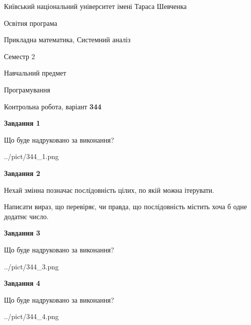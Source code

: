 \documentclass[12pt, ukrainian]{article}
\begin{document}
{{\begin {small}\par
{ \center  Київський національний університет імені Тараса Шевченка \par}
{\parbox {5 cm}{Освітня програма \hfill}{\parbox {8 cm}{Прикладна математика, Системний аналіз \hfill}}\parbox {5 cm}{\hfill Семестр 2}}\par
{\parbox {5 cm} {Навчальний предмет \hfill}\parbox {7 cm}{Програмування \hfill}\parbox {6cm}{\hfill}\par}\vspace{-7pt} \end{small}}{\center Контрольна робота, варіант  \No \textbf
{ 344 }\par}}
{
\begin {large}
{\begin {center}\textbf{Завдання 1}\end {center}}\par
Що буде надруковано за виконання?\par\par
\begin{center}
	{../pict/344_1.png}
\end{center}
\newpage

{\begin {center}\textbf{Завдання 2}\end {center}}\par
Нехай змінна  позначає послідовність цілих, по якій можна ітерувати.

Написати вираз, що перевіряє, чи правда, що послідовність  містить хоча б одне додатнє число.\par
\newpage

{\begin {center}\textbf{Завдання 3}\end {center}}\par
Що буде надруковано за виконання?\par
\begin{center}
	{../pict/344_3.png}
\end{center}
\newpage

{\begin {center}\textbf{Завдання 4}\end {center}}\par
Що буде надруковано за виконання?\par
\begin{center}
	{../pict/344_4.png}
\end{center}
\newpage


\end{large}}
\end{document}
